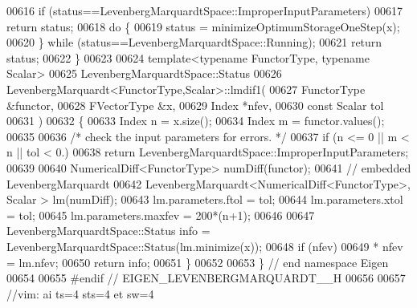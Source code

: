 \begin{DoxyCode}
00616     \textcolor{keywordflow}{if} (status==LevenbergMarquardtSpace::ImproperInputParameters)
00617         \textcolor{keywordflow}{return} status;
00618     \textcolor{keywordflow}{do} \{
00619         status = minimizeOptimumStorageOneStep(x);
00620     \} \textcolor{keywordflow}{while} (status==LevenbergMarquardtSpace::Running);
00621     \textcolor{keywordflow}{return} status;
00622 \}
00623 
00624 \textcolor{keyword}{template}<\textcolor{keyword}{typename} FunctorType, \textcolor{keyword}{typename} Scalar>
00625 LevenbergMarquardtSpace::Status
00626 LevenbergMarquardt<FunctorType,Scalar>::lmdif1(
00627         FunctorType &functor,
00628         FVectorType  &x,
00629         Index *nfev,
00630         \textcolor{keyword}{const} Scalar tol
00631         )
00632 \{
00633     Index n = x.size();
00634     Index m = functor.values();
00635 
00636     \textcolor{comment}{/* check the input parameters for errors. */}
00637     \textcolor{keywordflow}{if} (n <= 0 || m < n || tol < 0.)
00638         \textcolor{keywordflow}{return} LevenbergMarquardtSpace::ImproperInputParameters;
00639 
00640     NumericalDiff<FunctorType> numDiff(functor);
00641     \textcolor{comment}{// embedded LevenbergMarquardt}
00642     LevenbergMarquardt<NumericalDiff<FunctorType>, Scalar > lm(numDiff);
00643     lm.parameters.ftol = tol;
00644     lm.parameters.xtol = tol;
00645     lm.parameters.maxfev = 200*(n+1);
00646 
00647     LevenbergMarquardtSpace::Status info = LevenbergMarquardtSpace::Status(lm.minimize(x));
00648     \textcolor{keywordflow}{if} (nfev)
00649         * nfev = lm.nfev;
00650     \textcolor{keywordflow}{return} info;
00651 \}
00652 
00653 \} \textcolor{comment}{// end namespace Eigen}
00654 
00655 \textcolor{preprocessor}{#endif // EIGEN\_LEVENBERGMARQUARDT\_\_H}
00656 
00657 \textcolor{comment}{//vim: ai ts=4 sts=4 et sw=4}
\end{DoxyCode}
